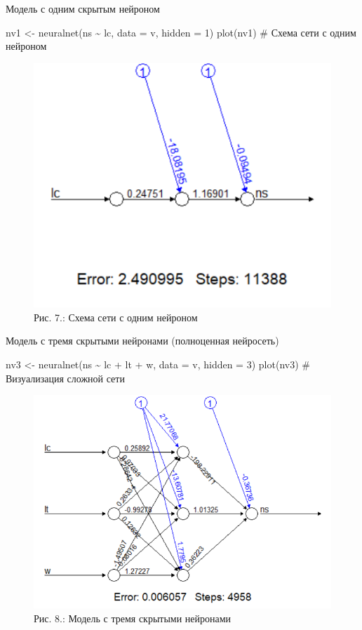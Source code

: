 \documentclass[
  letterpaper,
  DIV=11,
  numbers=noendperiod]{scrreprt}
\newenvironment{Shaded}{\begin{snugshade}}{\end{snugshade}}
\newcommand{\AttributeTok}[1]{\textcolor[rgb]{0.40,0.45,0.13}{#1}}
\newcommand{\CommentTok}[1]{\textcolor[rgb]{0.37,0.37,0.37}{#1}}
\newcommand{\DecValTok}[1]{\textcolor[rgb]{0.68,0.00,0.00}{#1}}
\newcommand{\FunctionTok}[1]{\textcolor[rgb]{0.28,0.35,0.67}{#1}}
\newcommand{\NormalTok}[1]{\textcolor[rgb]{0.00,0.23,0.31}{#1}}
\newcommand{\OtherTok}[1]{\textcolor[rgb]{0.00,0.23,0.31}{#1}}
\newcommand{\SpecialCharTok}[1]{\textcolor[rgb]{0.37,0.37,0.37}{#1}}
\begin{document}
Модель с одним скрытым нейроном

\begin{Shaded}
\begin{Highlighting}[]
\NormalTok{nv1 }\OtherTok{\textless{}{-}} \FunctionTok{neuralnet}\NormalTok{(ns }\SpecialCharTok{\textasciitilde{}}\NormalTok{ lc, }\AttributeTok{data =}\NormalTok{ v, }\AttributeTok{hidden =} \DecValTok{1}\NormalTok{)}
\FunctionTok{plot}\NormalTok{(nv1)  }\CommentTok{\# Схема сети с одним нейроном}
\end{Highlighting}
\end{Shaded}

\begin{figure}[H]

{\centering \includegraphics[width=0.4\linewidth,height=\textheight,keepaspectratio]{images/KOROSOV7.PNG}

}

\caption{Рис. 7.: Схема сети с одним нейроном}

\end{figure}%

Модель с тремя скрытыми нейронами (полноценная нейросеть)

\begin{Shaded}
\begin{Highlighting}[]
\NormalTok{nv3 }\OtherTok{\textless{}{-}} \FunctionTok{neuralnet}\NormalTok{(ns }\SpecialCharTok{\textasciitilde{}}\NormalTok{ lc }\SpecialCharTok{+}\NormalTok{ lt }\SpecialCharTok{+}\NormalTok{ w, }\AttributeTok{data =}\NormalTok{ v, }\AttributeTok{hidden =} \DecValTok{3}\NormalTok{)}
\FunctionTok{plot}\NormalTok{(nv3)  }\CommentTok{\# Визуализация сложной сети}
\end{Highlighting}
\end{Shaded}

\begin{figure}[H]

{\centering \includegraphics[width=0.4\linewidth,height=\textheight,keepaspectratio]{images/KOROSOV8.PNG}

}

\caption{Рис. 8.: Модель с тремя скрытыми нейронами}

\end{figure}%
\end{document}
